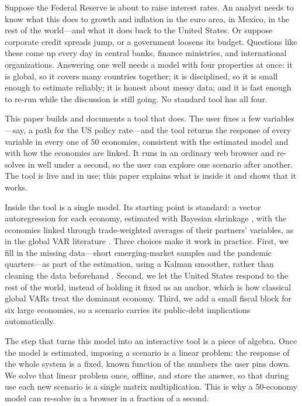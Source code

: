 \documentclass[11pt]{article}
\begin{document}
Suppose the Federal Reserve is about to raise interest rates. An analyst needs to know what this does to
growth and inflation in the euro area, in Mexico, in the rest of the world---and what it does back to the
United States. Or suppose corporate credit spreads jump, or a government loosens its budget. Questions
like these come up every day in central banks, finance ministries, and international organizations.
Answering one well needs a model with four properties at once: it is global, so it covers many countries
together; it is disciplined, so it is small enough to estimate reliably; it is honest about messy data;
and it is fast enough to re-run while the discussion is still going. No standard tool has all four.

This paper builds and documents a tool that does. The user fixes a few variables---say, a path for the US
policy rate---and the tool returns the response of every variable in every one of $50$ economies,
consistent with the estimated model and with how the economies are linked. It runs in an ordinary web
browser and re-solves in well under a second, so the user can explore one scenario after another. The
tool is live and in use; this paper explains what is inside it and shows that it works.

Inside the tool is a single model. Its starting point is standard: a vector autoregression for each
economy, estimated with Bayesian shrinkage \citep{Litterman1986,GiannoneLenzaPrimiceri2019}, with the
economies linked through trade-weighted averages of their partners' variables, as in the global VAR
literature \citep{PesaranSchuermannWeiner2004,DeesDiMauroPesaranSmith2007}. Three choices make it work in
practice. First, we fill in the missing data---short emerging-market samples and the pandemic
quarters---as part of the estimation, using a Kalman smoother, rather than cleaning the data beforehand
\citep{DurbinKoopman2012,LenzaPrimiceri2022}. Second, we let the United States respond to the rest of the
world, instead of holding it fixed as an anchor, which is how classical global VARs treat the dominant
economy. Third, we add a small fiscal block for six large economies, so a scenario carries its
public-debt implications automatically.

The step that turns this model into an interactive tool is a piece of algebra. Once the model is
estimated, imposing a scenario is a linear problem: the response of the whole system is a fixed, known
function of the numbers the user pins down. We solve that linear problem once, offline, and store the
answer, so that during use each new scenario is a single matrix multiplication. This is why a
$50$-economy model can re-solve in a browser in a fraction of a second.
\end{document}
